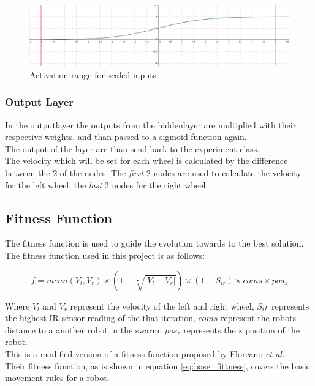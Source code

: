 \begin{figure}[h]
\begin{center}
\includegraphics[scale=0.4]{Chapter2/images/scaled.png}
\caption{Activation range for scaled inputs}
\label{fig:scaled}
\end{center}
\end{figure}

\subsubsection{Output Layer}
In the outputlayer the outputs from the hiddenlayer are multiplied with their respective weights, and than passed to a sigmoid function again.\\
The output of the layer are than send back to the experiment class.\\
The velocity which will be set for each wheel is calculated by the difference between the 2 of the nodes. 
The \textit{first} 2 nodes are used to calculate the velocity for the left wheel, the \textit{last} 2 nodes for the right wheel. 

\subsection{Fitness Function}\label{chap2:fitness_function}
The fitness function is used to guide the evolution towards to the best solution.\\
The fitness function used in this project is as follows:

\begin{equation}\label{eq:full_fittness}
f = mean(V_l, V_r) \times (1 - \sqrt[•]{|V_l - V_r|}) \times (1 - S_{ir}) \times coms \times pos_z
\end{equation}

Where $V_l$ and $V_r$ represent the velocity of the left and right wheel, $S_ir$ represents the highest IR sensor reading of the that iteration, $coms$ represent the robots distance to a another robot in the swarm. $pos_z$ represents the z position of the robot. \\
This is a modified version of a fitness function proposed by Floreano \textit{et al.}\cite{499791}. \\
Their fitness function, as is shown in equation \ref{eq:base_fittness}, covers the basic movement rules for a robot. 

